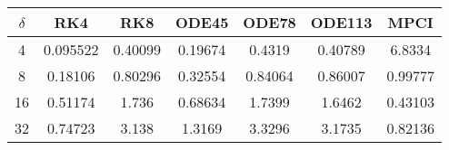 \begin{tabular}{ccccccc}
\hline
$\delta$ & RK4 & RK8 & ODE45 & ODE78 & ODE113 &MPCI\\ 
\hline 
4 & 0.095522 & 0.40099 & 0.19674 & 0.4319 & 0.40789 & 6.8334 \\ 
8 & 0.18106 & 0.80296 & 0.32554 & 0.84064 & 0.86007 & 0.99777\\ 
16 & 0.51174 & 1.736 & 0.68634 & 1.7399 & 1.6462 & 0.43103\\ 
32 & 0.74723 & 3.138 & 1.3169 & 3.3296 & 3.1735 & 0.82136\\ 
\hline 
\end{tabular}